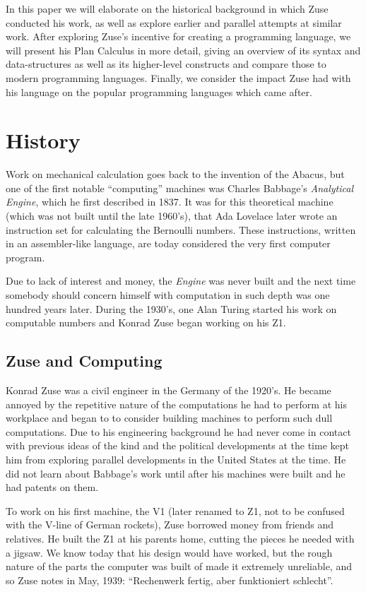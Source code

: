 \documentclass{llncs}
\begin{document}
   In this paper we will elaborate on the historical background in which 
   Zuse conducted his work, as well as explore earlier and parallel attempts 
   at similar work. After exploring Zuse's incentive for creating a programming 
   language, we will present his Plan Calculus in more detail, giving an overview 
   of its syntax and data-structures as well as its higher-level constructs and compare 
   those to modern programming languages. Finally, we consider the impact Zuse
   had with his language on the popular programming languages which came after.
 \section{History}
   Work on mechanical calculation goes back to the invention of the Abacus, but one 
   of the first notable ``computing'' machines was Charles Babbage's \emph{Analytical Engine},
   which he first described in 1837. It was for this theoretical machine (which was not built until the 
   late 1960's), that Ada Lovelace later wrote an instruction set for calculating the Bernoulli numbers.
   These instructions, written in an assembler-like language, are today considered the very first computer program.

   Due to lack of interest and money, the \emph{Engine} was never built and the next 
   time somebody should concern himself with computation in such depth was 
   one hundred years later. During the 1930's, one Alan Turing started his work on computable numbers
   and Konrad Zuse began working on his Z1.
 \subsection{Zuse and Computing}
   Konrad Zuse was a civil engineer in the Germany of the 1920's. He became annoyed by
   the repetitive nature of the computations he had to perform at his workplace and began to 
   to consider building machines to perform such dull computations.
   Due to his engineering background he had never come in contact with previous 
   ideas of the kind and the political developments at the time kept him 
   from exploring parallel developments in the United States at the time. He did not learn
   about Babbage's work until after his machines were built and he had patents on them\cite{epegmagHorstzuse}.

   To work on his first machine, the V1 (later renamed to Z1, not to be 
   confused with the V-line of German rockets), Zuse borrowed money
   from friends and relatives. He built the Z1 at his parents home, cutting the 
   pieces he needed with a jigsaw. We know today that his design would have worked,
   but the rough nature of the parts the computer was built of made it extremely unreliable,
   and so Zuse notes in May, 1939: ``Rechenwerk fertig, aber funktioniert schlecht''\cite{rojas2002plankalkuel}.
\end{document}
